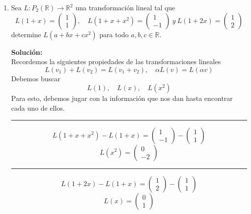 \documentclass[12pt]{article}
\newenvironment{solucion}
{\begin{mdframed}[backgroundcolor=black!10]
		{\bf Solución:}\\
	}
	{
	\end{mdframed}
}
\newenvironment{preguntas}
{\begin{enumerate}\itemsep12pt
	}
	{
	\end{enumerate}
}
\newcommand{\ra}{\rightarrow}
\newcommand{\R}{\mathbb{R}}
\begin{document}
\begin{preguntas}
\begin{solucion}
Como el conjunto $\{T(u), T(v)\}$ es $LD$, existen $\alpha, \beta \neq 0$, tales que 
$$\alpha T(u) + \beta T(v) = 0$$
Usando la propiedad de linealidad para las transformaciones lineales, también tenemos que
$$ T(\alpha u +\beta v) = 0$$
Por otro lado, como $\{u, v\}$ es $LI$ y $\alpha, \beta \neq 0$, el vector $\alpha u +\beta v$ no puede ser cero. Por ende, se concluye que $\alpha u +\beta v$ es una solución no trivial de $T(x) = 0$.
\end{solucion}
\item Sea $L: P_2(\R) \ra \R^2$ una transformación lineal tal que
	$$L(1+x) = \begin{pmatrix}
	1\\
	1
	\end{pmatrix}, \quad L(1+x+x^2) = \begin{pmatrix}
	1\\
	-1
	\end{pmatrix}\ y \ L(1+2x) = \begin{pmatrix}
	1\\
	2
	\end{pmatrix}$$
	determine $L(a+bx+cx^2)$ para todo $a,b,c \in \R$.
\begin{solucion}
Recordemos la siguientes propiedades de las transformaciones lineales
		$$L(v_1) + L(v_2) = L(v_1 + v_2), \quad \alpha L(v) = L(\alpha v)$$
		Debemos buscar 
		$$L(1), \quad L(x), \quad L(x^2)$$
		Para esto, debemos jugar con la información que nos dan hasta encontrar cada uno de ellos.
		\begin{center}\rule{14.5cm}{0.1pt}\end{center}
		$$L(1+x+x^2) - L(1+x) = \begin{pmatrix}
		1\\-1
		\end{pmatrix} - \begin{pmatrix}
		1\\1
		\end{pmatrix}$$
		$$L(x^2) = \begin{pmatrix}
		0\\-2
		\end{pmatrix}$$
		
		\begin{center}\rule{14.5cm}{0.1pt}\end{center}
		$$L(1+2x) - L(1+x) = \begin{pmatrix}
		1\\2
		\end{pmatrix} - \begin{pmatrix}
		1\\1
		\end{pmatrix}$$
		$$L(x) = \begin{pmatrix}
		0\\1
		\end{pmatrix}$$
		

\end{solucion}
\end{preguntas}
\end{document}
